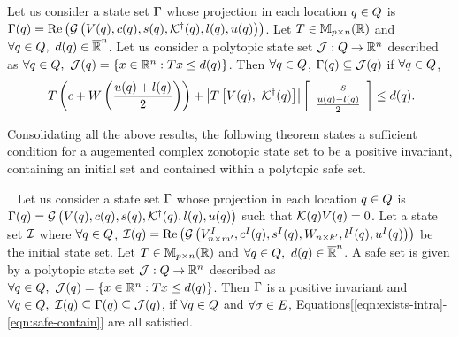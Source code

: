 \begin{lemma}
  Let us consider a state set $\Gamma$ whose projection in each location
  $q \in Q$ is $\Gamma(q) =
  \operatorname{\operatorname{Re}}\left(\mathcal{G}\left(V(q),c(q),s(q),\mathcal{K}^\dagger(q),l(q),u(q)\right)\right)$.
  Let $T\in\mathbb{M}_{p\times n}(\mathbb{R})$ and
  $\forall q\in Q,~d(q)\in\mathbb{\overline{R}}^n$.  Let us
  consider a polytopic state set $\mathcal{J}:Q\rightarrow\mathbb{R}^n$
  described as $\forall
  q\in Q,~\mathcal{J}(q)=\left\{x\in\mathbb{R}^n:Tx\leq
  d(q)\right\}$.  Then $\forall q\in Q$,
  $\Gamma(q)\subseteq \mathcal{J}(q)$ if $\forall q\in Q$,
\begin{align}~\label{eqn:safe-contain}
T\left(c+W\left(\frac{u(q)+l(q)}{2}\right)\right)+\left|T\left[V(q),~\mathcal{K}^\dagger(q)\right]\right|\left[\begin{array}{l}{\hspace{2em}s}\\{\frac{u(q)-l(q)}{2}} \end{array}\right]\leq d(q).
\end{align}
\end{lemma}

Consolidating all the above results, the following theorem states a
sufficient condition for a augemented complex zonotopic state set to
be a positive invariant, containing an initial set and contained
within a polytopic safe set.

\begin{theorem}~\label{thm:main} Let us consider a state set
  $\Gamma$ whose projection in each location $q\in Q$
  is $\Gamma(q) =
  \mathcal{G}\left(V(q),c(q),s(q),\mathcal{K}^\dagger(q),l(q),u(q)\right)$
  such that $\mathcal{K}(q)V(q) = 0$.  Let a state set $\mathcal{I}$
  where $\forall q\in Q$,
  $\mathcal{I}(q)=\operatorname{\operatorname{Re}}\left(\mathcal{G}\left(V^I_{n\times
      m^\prime },c^I(q),s^I(q),W_{n\times
      k^\prime},l^I(q),u^I(q)\right)\right)$ be the initial state set.  Let $T\in\mathbb{M}_{p\times n}(\mathbb{R})$ and
  $\forall q\in Q,~d(q)\in\mathbb{\overline{R}}^n$.  A safe set
  is given by a polytopic
  state set $\mathcal{J}:Q\rightarrow\mathbb{R}^n$ described as $\forall
  q\in Q,~\mathcal{J}(q)=\left\{x\in\mathbb{R}^n:Tx\leq
  d(q)\right\}$.  Then $\Gamma$ is a positive
  invariant and $\forall
  q\in Q,~\mathcal{I}(q)\subseteq\Gamma(q)\subseteq
  \mathcal{J}(q)$, if $\forall q\in Q$ and $\forall
  \sigma\in E$,
  Equations[\ref{eqn:exists-intra}-\ref{eqn:safe-contain}] are all
  satisfied.
\end{theorem}